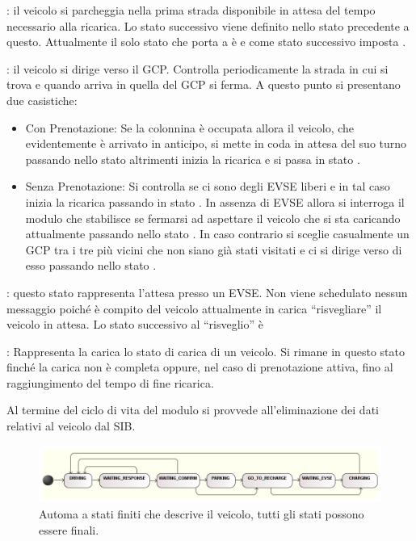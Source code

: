 \begin{description}
	\item {}: il veicolo si parcheggia nella prima strada disponibile in attesa del tempo necessario alla ricarica. Lo stato successivo viene definito nello stato precedente a questo. Attualmente il solo stato che porta a  è  e come stato successivo imposta .
	\item {}: il veicolo si dirige verso il GCP. Controlla periodicamente la strada in cui si trova e quando arriva in quella del GCP  si ferma. A questo punto si presentano due casistiche:
	\begin{itemize}
		\item{Con Prenotazione}: Se la colonnina è occupata allora il veicolo, che evidentemente è arrivato in anticipo, si mette in coda in attesa del suo turno passando nello stato  altrimenti inizia la ricarica e si passa in stato .
		\item{Senza Prenotazione}: Si controlla se ci sono degli EVSE liberi e in tal caso inizia la ricarica passando in stato . In assenza di EVSE allora si interroga il modulo  che stabilisce se fermarsi ad aspettare il veicolo che si sta caricando attualmente passando nello stato . In caso contrario si sceglie casualmente un GCP tra i tre più vicini che non siano già stati visitati e ci si dirige verso di esso passando nello stato . 
	\end{itemize}
	\item {}: questo stato rappresenta l'attesa presso un EVSE. Non viene schedulato nessun messaggio poiché è compito del veicolo attualmente in carica ``risvegliare'' il veicolo in attesa. Lo stato successivo al ``risveglio'' è 
	\item {}: Rappresenta la carica lo stato di carica di un veicolo. Si rimane in questo stato finché la carica non è completa oppure, nel caso di prenotazione attiva, fino al raggiungimento del tempo di fine ricarica.
\end{description}


Al termine del ciclo di vita del modulo si provvede all'eliminazione dei dati relativi al veicolo dal SIB.
	
\begin{figure}
	\centering
	\includegraphics[width=1.0\textwidth]{assets/car-fsmd.png}
	\caption{Automa a stati finiti che descrive il veicolo, tutti gli stati possono essere finali.}
	\label{fig:car-fsmd}
\end{figure}


